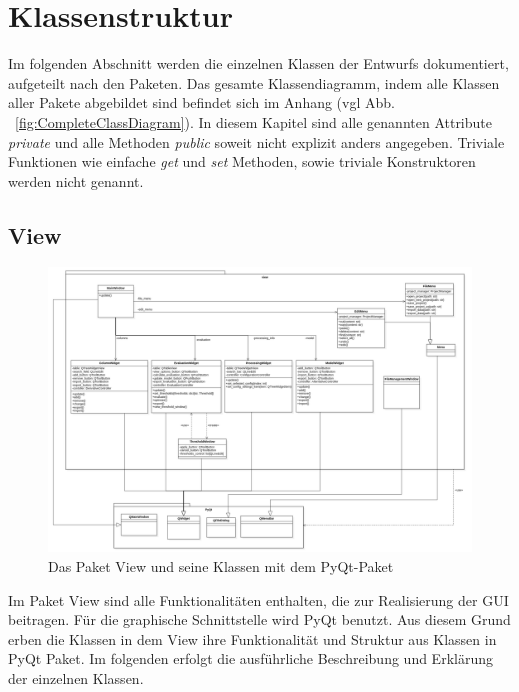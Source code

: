 \documentclass{article}
\begin{document}
\newpage
\section{Klassenstruktur}
Im folgenden Abschnitt werden die einzelnen Klassen der Entwurfs dokumentiert, aufgeteilt nach den Paketen. Das gesamte Klassendiagramm, indem alle Klassen aller Pakete abgebildet sind befindet sich im Anhang (vgl Abb. ~\ref{fig:CompleteClassDiagram}). In diesem Kapitel sind alle genannten Attribute \emph{private} und alle Methoden \emph{public} soweit nicht explizit anders angegeben. Triviale Funktionen wie einfache \emph{get} und \emph{set} Methoden, sowie triviale Konstruktoren werden nicht genannt.

\subsection{View}
\begin{figure}[H]%
    \centering
    \includegraphics[width=15cm]{entwurf/Entwurf_dokument/img/Alissa/ViewUpdated.png}
    \caption{Das Paket View und seine Klassen mit dem PyQt-Paket}
\end{figure}
Im Paket View sind alle Funktionalitäten enthalten, die zur Realisierung der GUI beitragen. Für die graphische Schnittstelle wird PyQt benutzt. Aus diesem Grund erben die Klassen in dem View ihre Funktionalität und Struktur aus Klassen in PyQt Paket. Im folgenden erfolgt die ausführliche Beschreibung und Erklärung der einzelnen Klassen.
\end{document}
